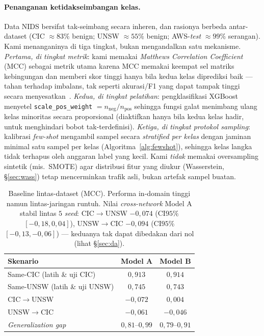 \documentclass[11pt,a4paper]{article}
\begin{document}
\paragraph{Penanganan ketidakseimbangan kelas.} Data NIDS bersifat tak-seimbang
secara inheren, dan rasionya berbeda antar-dataset (CIC $\approx 83\%$ benign;
UNSW $\approx 55\%$ benign; AWS-\emph{test} $\approx 99\%$ serangan). Kami
menanganinya di tiga tingkat, bukan mengandalkan satu mekanisme. \emph{Pertama, di
tingkat metrik}: kami memakai \emph{Matthews Correlation Coefficient} (MCC) sebagai
metrik utama karena MCC memakai keempat sel matriks kebingungan dan memberi skor
tinggi hanya bila kedua kelas diprediksi baik --- tahan terhadap imbalans, tak
seperti akurasi/F1 yang dapat tampak tinggi secara menyesatkan~\cite{chicco}.
\emph{Kedua, di tingkat pelatihan}: pengklasifikasi XGBoost menyetel
\texttt{scale\_pos\_weight} $= n_{\text{neg}}/n_{\text{pos}}$ sehingga fungsi galat
menimbang ulang kelas minoritas secara proporsional (diaktifkan hanya bila kedua
kelas hadir, untuk menghindari bobot tak-terdefinisi). \emph{Ketiga, di tingkat
protokol sampling}: kalibrasi \emph{few-shot} mengambil sampel secara
\emph{stratified per kelas} dengan jaminan minimal satu sampel per kelas
(Algoritma~\ref{alg:fewshot}), sehingga kelas langka tidak terhapus oleh anggaran
label yang kecil. Kami \emph{tidak} memakai oversampling sintetik (mis.\ SMOTE) agar
distribusi fitur yang diukur (Wasserstein, \S\ref{sec:wass}) tetap mencerminkan
trafik asli, bukan artefak sampel buatan.

\begin{table}[h]
\centering
\caption{Baseline lintas-dataset (MCC). Performa in-domain tinggi namun
lintas-jaringan runtuh. Nilai \emph{cross-network} Model A stabil lintas $5$
\emph{seed}: CIC$\rightarrow$UNSW $-0{,}074$ (CI$95\%$ $[-0{,}18,0{,}04]$),
UNSW$\rightarrow$CIC $-0{,}094$ (CI$95\%$ $[-0{,}13,-0{,}06]$) --- keduanya tak
dapat dibedakan dari nol (lihat \S\ref{sec:da}).}
\label{tab:baseline}
\begin{tabular}{lcc}
\toprule
Skenario & Model A & Model B \\
\midrule
Same-CIC (latih \& uji CIC)   & $0{,}913$ & $0{,}914$ \\
Same-UNSW (latih \& uji UNSW) & $0{,}745$ & $0{,}743$ \\
CIC$\rightarrow$UNSW          & $-0{,}072$ & $0{,}004$ \\
UNSW$\rightarrow$CIC          & $-0{,}061$ & $-0{,}046$ \\
\midrule
\emph{Generalization gap}     & $0{,}81$--$0{,}99$ & $0{,}79$--$0{,}91$ \\
\bottomrule
\end{tabular}
\end{table}
\end{document}
